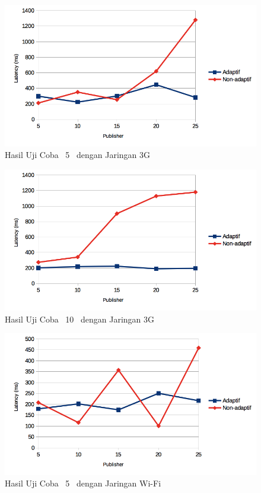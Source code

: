 \noindent
\begin{figure}
  \centering
  \includegraphics[scale=0.90]
	{images/4-3glatency5.png}
	\caption{Hasil Uji Coba \Latency~5 \Subscriber~dengan Jaringan 3G}
\label{fig:3glatency_5}
\end{figure}
\noindent

\begin{figure}
  \centering
  \includegraphics[scale=0.90]
	{images/4-3glatency10.png}
	\caption{Hasil Uji Coba \Latency~10 \Subscriber~dengan Jaringan 3G}
	\label{fig:3glatency_10}
\end{figure}

\noindent
\begin{figure}
  \centering
  \includegraphics[scale=0.90]
	{images/4-latency5.png}
	\caption{Hasil Uji Coba \Latency~5 \Subscriber~dengan Jaringan Wi-Fi}
\label{fig:latency_5}
\end{figure}
\noindent


